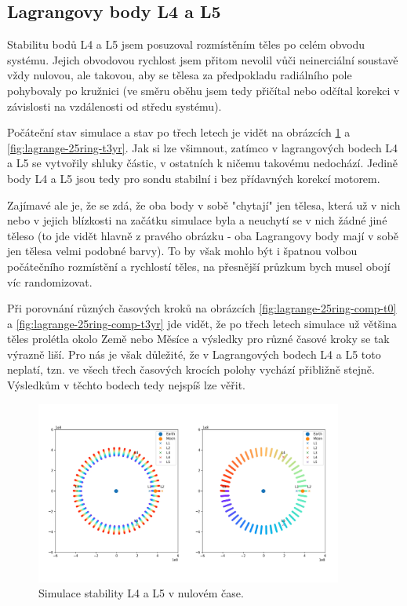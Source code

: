 \documentclass[a4paper,11pt]{article}
\begin{document}
\subsection{Lagrangovy body L4 a L5}

Stabilitu bodů L4 a L5 jsem posuzoval rozmístěním těles po celém obvodu systému. Jejich obvodovou 
rychlost jsem přitom nevolil vůči neinerciální soustavě vždy nulovou, ale takovou, aby se tělesa za předpokladu radiálního
pole pohybovaly po kružnici (ve směru oběhu jsem tedy přičítal nebo odčítal korekci v závislosti na vzdálenosti od středu systému).

Počáteční stav simulace a stav po třech letech je vidět na obrázcích \ref{fig:lagrange-25ring-t0} a \ref{fig:lagrange-25ring-t3yr}.
Jak si lze všimnout, zatímco v lagrangových bodech L4 a L5 se vytvořily shluky částic, v ostatních k ničemu takovému nedochází.
Jedině body L4 a L5 jsou tedy pro sondu stabilní i bez přídavných korekcí motorem.

Zajímavé ale je, že se zdá, že oba body v sobě "chytají" jen tělesa, která už v nich nebo v jejich blízkosti na začátku simulace byla
a neuchytí se v nich žádné jiné těleso (to jde vidět hlavně z pravého obrázku - oba Lagrangovy body mají v sobě
jen tělesa velmi podobné barvy). To by však mohlo být i špatnou volbou počátečního rozmístění a rychlostí těles,
na přesnější průzkum bych musel obojí víc randomizovat.

Při porovnání různých časových kroků na obrázcích \ref{fig:lagrange-25ring-comp-t0} a \ref{fig:lagrange-25ring-comp-t3yr}
jde vidět, že po třech letech simulace už většina těles prolétla okolo Země nebo Měsíce a výsledky pro různé časové kroky se tak výrazně
liší. Pro nás je však důležité, že v Lagrangových bodech L4 a L5 toto neplatí, tzn. ve všech třech časových krocích polohy vychází přibližně stejně.
Výsledkům v těchto bodech tedy nejspíš lze věřit.

\begin{figure}[h!]
    \centering
    \includegraphics[width=0.9\textwidth]{lagrange-25ring-t0.png}

    \caption{Simulace stability L4 a L5 v nulovém čase.}
    \label{fig:lagrange-25ring-t0}
\end{figure}
\end{document}
